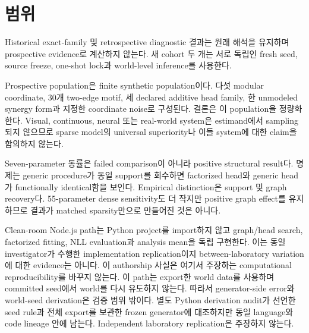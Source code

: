 \section{범위}

Historical exact-family 및 retrospective diagnostic 결과는 원래 해석을 유지하며
prospective evidence로 계산하지 않는다. 새 cohort 두 개는 서로 독립인 fresh seed,
source freeze, one-shot lock과 world-level inference를 사용한다.

Prospective population은 finite synthetic population이다. 다섯 modular coordinate,
30개 two-edge motif, 세 declared additive head family, 한 unmodeled synergy form과
지정한 coordinate noise로 구성된다. 결론은 이 population을 정량화한다. Visual,
continuous, neural 또는 real-world system은 estimand에서 sampling되지 않으므로
sparse model의 universal superiority나 이들 system에 대한 claim을 함의하지 않는다.

Seven-parameter 동률은 failed comparison이 아니라 positive structural result다.
명제는 generic procedure가 동일 support를 회수하면 factorized head와 generic head가
functionally identical함을 보인다. Empirical distinction은 support 및 graph
recovery다. 55-parameter dense sensitivity도 더 작지만 positive graph effect를
유지하므로 결과가 matched sparsity만으로 만들어진 것은 아니다.

Clean-room Node.js path는 Python project를 import하지 않고 graph/head search,
factorized fitting, NLL evaluation과 analysis mean을 독립 구현한다. 이는 동일
investigator가 수행한 implementation replication이지 between-laboratory variation에
대한 evidence는 아니다. 이 authorship 사실은 여기서 주장하는 computational
reproducibility를 바꾸지 않는다. 이 path는 export한 world data를 사용하며 committed
seed에서 world를 다시 유도하지 않는다. 따라서 generator-side error와 world-seed
derivation은 검증 범위 밖이다. 별도 Python derivation audit가 선언한 seed rule과
전체 export를 보관한 frozen generator에 대조하지만 동일 language와 code lineage
안에 남는다. Independent laboratory replication은 주장하지 않는다.
